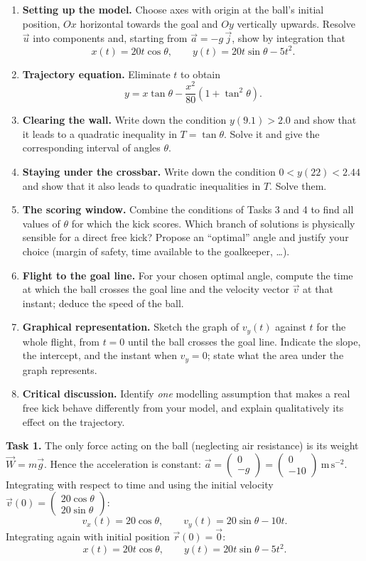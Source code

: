 \documentclass[11pt]{article}
\newcounter{popsec}
\newcounter{popsub}
\newcommand{\courssub}[1]{%
  \stepcounter{popsub}%
  \par\vspace{9pt}\noindent{\popxbold\fontsize{11.5}{13}\selectfont\color{popink}{\color{poporange}\thepopsec.\thepopsub}\hspace{6pt}#1}\par\nopagebreak\vspace{4pt}
}
\begin{document}
\begin{enumerate}
\item \textbf{Setting up the model.} Choose axes with origin at the ball's initial position, $Ox$ horizontal towards the goal and $Oy$ vertically upwards. Resolve $\vec{u}$ into components and, starting from $\vec{a} = -g\,\vec{j}$, show by integration that
\[ x(t) = 20t\cos\theta, \qquad y(t) = 20t\sin\theta - 5t^{2}. \]
\item \textbf{Trajectory equation.} Eliminate $t$ to obtain
\[ y = x\tan\theta - \frac{x^{2}}{80}\left(1+\tan^{2}\theta\right). \]
\item \textbf{Clearing the wall.} Write down the condition $y(9.1) > 2.0$ and show that it leads to a quadratic inequality in $T = \tan\theta$. Solve it and give the corresponding interval of angles $\theta$.
\item \textbf{Staying under the crossbar.} Write down the condition $0 < y(22) < 2.44$ and show that it also leads to quadratic inequalities in $T$. Solve them.
\item \textbf{The scoring window.} Combine the conditions of Tasks 3 and 4 to find all values of $\theta$ for which the kick scores. Which branch of solutions is physically sensible for a direct free kick? Propose an ``optimal'' angle and justify your choice (margin of safety, time available to the goalkeeper, \dots).
\item \textbf{Flight to the goal line.} For your chosen optimal angle, compute the time at which the ball crosses the goal line and the velocity vector $\vec{v}$ at that instant; deduce the speed of the ball.
\item \textbf{Graphical representation.} Sketch the graph of $v_{y}(t)$ against $t$ for the whole flight, from $t = 0$ until the ball crosses the goal line. Indicate the slope, the intercept, and the instant when $v_{y} = 0$; state what the area under the graph represents.
\item \textbf{Critical discussion.} Identify \emph{one} modelling assumption that makes a real free kick behave differently from your model, and explain qualitatively its effect on the trajectory.
\end{enumerate}

\courssub{Model answer}

\textbf{Task 1.} The only force acting on the ball (neglecting air resistance) is its weight $\vec{W}=m\vec{g}$. Hence the acceleration is constant: $\vec{a} = \begin{pmatrix} 0 \\ -g \end{pmatrix} = \begin{pmatrix} 0 \\ -10 \end{pmatrix}\ \mathrm{m\,s^{-2}}$. Integrating with respect to time and using the initial velocity $\vec{v}(0) = \begin{pmatrix} 20\cos\theta \\ 20\sin\theta \end{pmatrix}$:
\[ v_{x}(t) = 20\cos\theta, \qquad v_{y}(t) = 20\sin\theta - 10t. \]
Integrating again with initial position $\vec{r}(0)=\vec{0}$:
\[ x(t) = 20t\cos\theta, \qquad y(t) = 20t\sin\theta - 5t^{2}. \]
\end{document}
